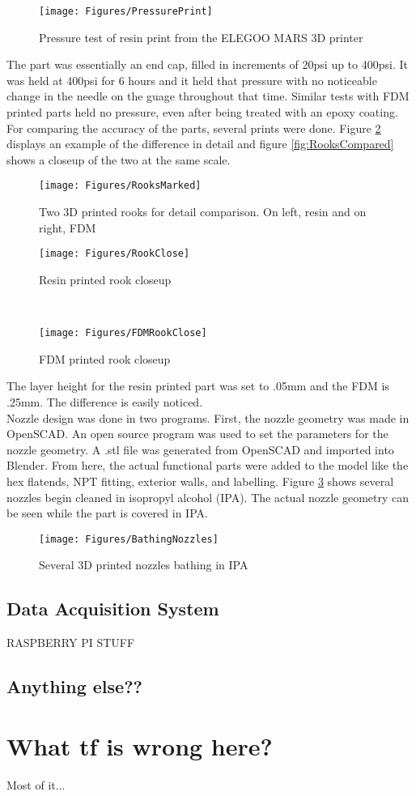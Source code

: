 \begin{figure}[h!]
\centering
\texttt{[image: Figures/PressurePrint]}
\caption{Pressure test of resin print from the ELEGOO MARS 3D printer}
\label{fig:PressurePrint}
\end{figure}
The part was essentially an end cap, filled in increments of 20psi up to 400psi. It was held at 400psi for 6 hours and it held that pressure with no noticeable change in the needle on the guage throughout that time. Similar tests with FDM printed parts held no pressure, even after being treated with an epoxy coating. For comparing the accuracy of the parts, several prints were done. Figure \ref{fig:Rooks} displays an example of the difference in detail and figure \ref{fig:RooksCompared} shows a closeup of the two at the same scale.\clearpage
\begin{figure}[h!]
\centering
\texttt{[image: Figures/RooksMarked]}
\caption{Two 3D printed rooks for detail comparison. On left, resin and on right, FDM}
\label{fig:Rooks}
\end{figure}
\begin{figure*}[t!]
    \centering
    \begin{subfigure}[t]{0.5\textwidth}
        \centering
        \texttt{[image: Figures/RookClose]}
        \caption{Resin printed rook closeup}
    \end{subfigure}%
    ~ 
    \begin{subfigure}[t]{0.5\textwidth}
        \centering
        \texttt{[image: Figures/FDMRookClose]}
        \caption{FDM printed rook closeup}
    \end{subfigure}
    \caption{Rook closeups}
\label{fig:RooksCompared}
\end{figure*}
The layer height for the resin printed part was set to .05mm and the FDM is .25mm. The difference is easily noticed.\\
Nozzle design was done in two programs. First, the nozzle geometry was made in OpenSCAD. An open source program was used to set the parameters for the nozzle geometry. A .stl file was generated from OpenSCAD and imported into Blender. From here, the actual functional parts were added to the model like the hex flatends, NPT fitting, exterior walls, and labelling. Figure \ref{fig:BathingNozzles} shows several nozzles begin cleaned in isopropyl alcohol (IPA). The actual nozzle geometry can be seen while the part is covered in IPA.
\begin{figure}[h!]
\centering
\texttt{[image: Figures/BathingNozzles]}
\caption{Several 3D printed nozzles bathing in IPA}
\label{fig:BathingNozzles}
\end{figure}

\subsection{Data Acquisition System}
RASPBERRY PI STUFF
\subsection{Anything else??}

\section{What tf is wrong here?}
Most of it...